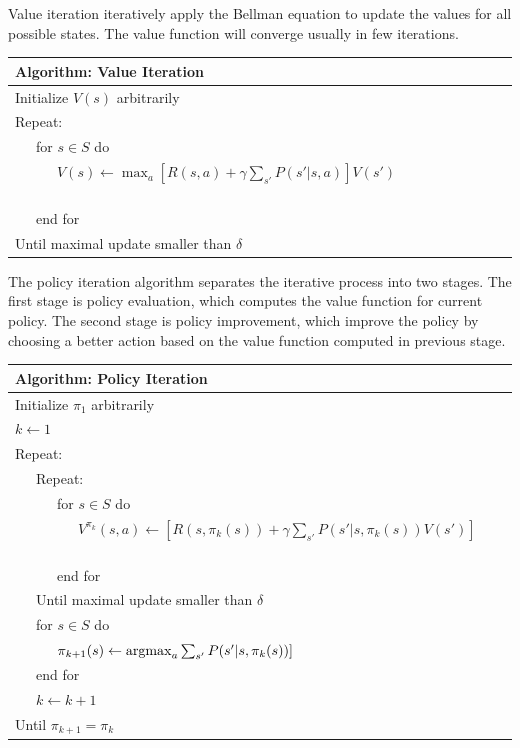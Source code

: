 Value iteration iteratively apply the Bellman equation to update the
values for all possible states. The value function will converge
usually in few iterations. 

\begin{center}
\begin{tabular}{@{}lp{6cm}@{}}
\hline
Algorithm: Value Iteration\\
\hline
Initialize $V(s)$ arbitrarily\\
Repeat:\\
\ \ \ for $s \in S$ do\\
\ \ \ \ \ \ $V(s) \leftarrow \max_a [R(s, a) + \gamma \sum_{s'} P(s'|s, a)]V(s')$\ \ \ \ \ \ \ \ \ \ \ \ \ \ \ \ \ \ \ \ \ \ \ \ \ \ \ \ \ \ \ \ \ \ \ \ \ \ \ \ \ \ \ \ \ \ \ \ \ \ \ \ \ \ \ \ \ \ \\
\ \ \ end for\\
Until maximal update smaller than $\delta$\\
\hline  
\end{tabular}
\end{center}

The policy iteration algorithm 
separates the iterative process into two stages.
The first stage is policy evaluation, which computes
the value function for current policy.
The second stage is policy improvement, which improve the policy 
by choosing a better action based on the value function computed in previous stage.

\begin{center}
\begin{tabular}{@{}lp{6cm}@{}}
\hline
Algorithm: Policy Iteration\\
\hline
Initialize $\pi_1$ arbitrarily\\
$k \leftarrow 1$\\
Repeat:\\
\ \ \ Repeat:\\
\ \ \ \ \ \ for $s \in S$ do\\
\ \ \ \ \ \ \ \ \ $V^{\pi_k}(s, a) \leftarrow [R(s, \pi_k(s)) + \gamma \sum_{s'} P(s'|s, \pi_k(s)) V(s')]$\ \ \ \ \ \ \ \ \ \ \ \ \ \ \ \ \ \ \ \ \ \ \ \ \ \ \ \ \ \ \ \ \ \ \ \ \ \ \ \ \ \ \ \ \ \ \ \ \\
\ \ \ \ \ \ end for\\
\ \ \ Until maximal update smaller than $\delta$\\
\ \ \ for $s \in S$ do\\
\ \ \ \ \ \ $\pi_{k+1}(s) \leftarrow \argmax_a \sum_{s'} P(s'|s, \pi_k(s))]$\\
\ \ \ end for\\
\ \ \ $k \leftarrow k + 1$\\
Until $\pi_{k+1} = \pi_{k}$\\
\hline  
\end{tabular}
\end{center}

